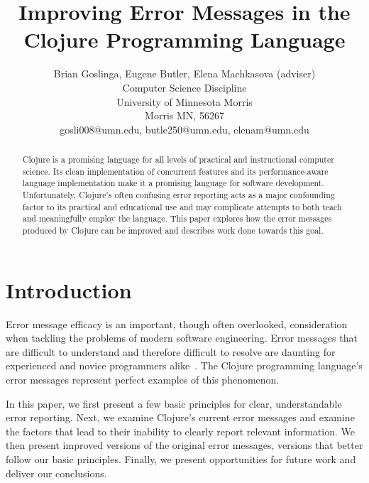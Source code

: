 \documentclass[12pt]{article}
\begin{document}
\pagestyle{plain}

\title{Improving Error Messages in the Clojure Programming Language}

\author{
Brian Goslinga, Eugene Butler, Elena Machkasova (adviser)\\
Computer Science Discipline \\
University of Minnesota Morris\\
Morris MN, 56267\\
gosli008@umn.edu, butle250@umn.edu, elenam@umn.edu
}

\date{}

\maketitle
\thispagestyle{empty}

\begin{abstract}
Clojure is a promising language for all levels of practical and instructional computer science. Its clean implementation of concurrent features and its performance-aware language implementation make it a promising language for software development. Unfortunately, Clojure's often confusing error reporting acts as a major confounding factor to its practical and educational use 
and may complicate attempts to both teach and meaningfully employ the language. This paper explores how the error messages produced by Clojure can be improved and describes work done towards this goal.
\end{abstract}

\newpage
\setcounter{page}{1}



\section{Introduction}
Error message efficacy is an important, though often overlooked, consideration
when tackling the problems of modern software engineering. Error messages that
are difficult to understand and therefore difficult to resolve are daunting for
experienced and novice programmers alike~\cite{traver:messages}. The Clojure programming language's error messages represent perfect examples of this phenomenon.

In this paper, we first present a few basic principles for clear, understandable error reporting. Next, we examine Clojure's current error messages and
examine the factors that lead to their inability to clearly report relevant information. We then present improved
versions of the original error messages, versions that better follow our basic
principles. Finally, we present opportunities for future work and deliver our conclusions.
\end{document}
